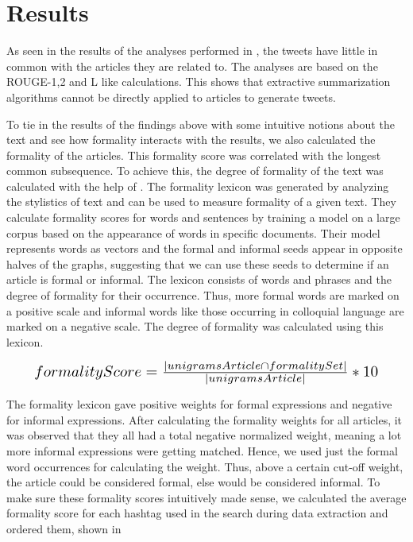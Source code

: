 \section{Results}

As seen in the results of the analyses performed in , the tweets have little in common with the articles they are related to. The analyses are based on the ROUGE-1,2 and L like calculations. This shows that extractive summarization algorithms cannot be directly applied to articles to generate tweets. 

To tie in the results of the findings above with some intuitive notions about the text and see how formality interacts with the results, we also calculated the formality of the articles. This formality score was correlated with the longest common subsequence. To achieve this, the degree of formality of the text was calculated with the help of . The formality lexicon was generated by analyzing the stylistics of text and can be used to measure formality of a given text. They calculate formality scores for words and sentences by training a model on a large corpus based on the appearance of words in specific documents. Their model represents words as vectors and the formal and informal seeds appear in opposite halves of the graphs, suggesting that we can use these seeds to determine if an article is formal or informal. The lexicon consists of words and phrases and the degree of formality for their occurrence. Thus, more formal words are marked on a positive scale and informal words like those occurring in colloquial language are marked on a negative scale. The degree of formality was calculated using this lexicon.

\begin{equation}
\resizebox{.9\hsize}{!}{$formalityScore = \frac{| unigramsArticle \cap formalitySet |}{| unigramsArticle |} * 10$}
\end{equation}

The formality lexicon gave positive weights for formal expressions and negative for informal expressions. After calculating the formality weights for all articles, it was observed that they all had a total negative normalized weight, meaning a lot more informal expressions were getting matched. Hence, we used just the formal word occurrences for calculating the weight. Thus, above a certain cut-off weight, the article could be considered formal, else would be considered informal. To make sure these formality scores intuitively made sense, we calculated the average formality score for each hashtag used in the search during data extraction and ordered them, shown in 


